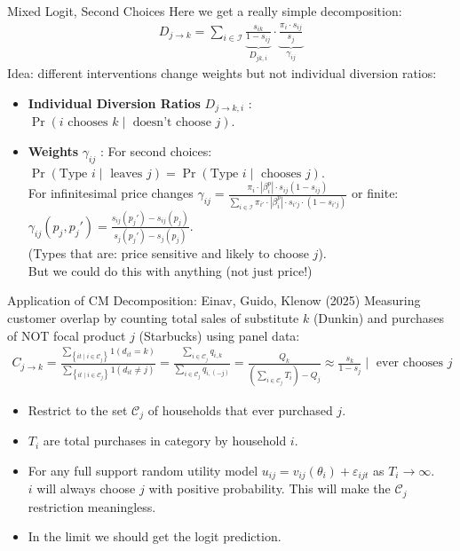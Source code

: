 \documentclass[aspectratio=169,10pt]{beamer}
\begin{document}
\begin{frame}{Mixed Logit, Second Choices}
Here we get a really simple decomposition:
\begin{align*}
D_{j \rightarrow k} = \sum_{i \in \mathcal{I}} \underbrace{\frac{s_{ik}}{1-s_{ij}}}_{D_{jk,i}} \cdot \underbrace{\frac{\pi_i \cdot s_{ij}}{s_{j}}}_{\gamma_{ij}}
\end{align*}
Idea: different interventions change \alert{weights} but not \alert{individual diversion ratios}:
\begin{itemize}
\item \textbf{Individual Diversion Ratios} $D_{j\rightarrow k,i}$ : $\Pr( i \text{ chooses } k \mid \text{ doesn't choose } j)$.

\item \textbf{Weights} $\gamma_{ij}$ : For second choices: $\Pr(\text{Type } i \mid \text{ leaves } j) =\Pr(\text{Type } i \mid \text{ chooses } j)$.\\ For infinitesimal price changes $\gamma_{ij}=\frac{\pi_i \cdot |\beta_i^p| \cdot s_{ij}(1-s_{ij})}{\sum_{i
 \in \mathcal{I}} \pi_{i'} \cdot |\beta_i^p| \cdot s_{i'j}\cdot(1-s_{i'j})}$ or finite: $\gamma_{ij}(p_j,p_j')=\frac{s_{ij}(p_j')-s_{ij}(p_j)}{s_{j}(p_j')-s_{j}(p_j)}$.\\
 (Types that are: price sensitive and likely to choose $j$).\\
 But we could do this with anything (not just price!)
\end{itemize}
\end{frame}


\begin{frame}{Application of CM Decomposition: Einav, Guido, Klenow (2025)}
Measuring \alert{customer overlap} by counting total sales of substitute $k$ (Dunkin) and purchases of NOT focal product $j$ (Starbucks) using \alert{panel data}:
\begin{align*}
C_{j \rightarrow k}= 
\frac{\sum_{\left\{i t \mid i \in \mathcal{C}_j\right\}} 1\left(d_{i t}=k\right)}{\sum_{\left\{i t \mid i \in \mathcal{C}_j\right\}} 1\left(d_{i t} \neq j\right)} 
=\frac{\sum_{i \in \mathcal{C}_j} q_{i,k}}{\sum_{i \in \mathcal{C}_j} q_{i,(-j)}} 
= \frac{Q_k}{\left(\sum_{i \in \mathcal{C}_j} T_i \right)
 -Q_j} \approx \frac{s_k}{1-s_j} \mid \text{ ever chooses } j
\end{align*}
\begin{itemize}
	\item Restrict to the set $\mathcal{C}_j$ of households that \alert{ever purchased} $j$.
	\item $T_i$ are total purchases in category by household $i$.
    \item For any full support random utility model $u_{ij} = v_{ij}(\theta_i) + \varepsilon_{ijt}$ as $T_i \rightarrow \infty$.\\
     $i$ will always choose $j$ with positive probability. This will make the $\mathcal{C}_j$ restriction meaningless.
    \item In the limit we should get the logit prediction.
\end{itemize}
\end{frame}
\end{document}
